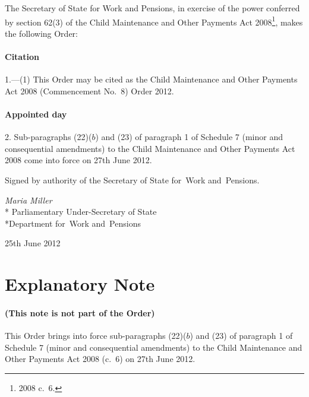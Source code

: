 \documentclass[12pt,a4paper]{article}
\title{\regstitle}
\author{S.I.\ 2012 No.\ 1649 (C.~61)}
\date{Made
25th June 2012
}
\begin{document}
\maketitle

\noindent
The Secretary of State for Work and Pensions, in exercise of the power conferred by section 62(3) of the Child Maintenance and Other Payments Act 2008\footnote{2008 c.~6.}, makes the following Order: 

{\sloppy

\tableofcontents

}

\bigskip

\setcounter{secnumdepth}{-2}

\subsection[1. Citation]{Citation}

1.---(1)  This Order may be cited as the Child Maintenance and Other Payments Act 2008 (Commencement No.~8) Order 2012.

\subsection[2. Appointed day]{Appointed day}

2.  Sub-paragraphs (22)($b$)  and (23) of paragraph 1 of Schedule 7 (minor and consequential amendments) to the Child Maintenance and Other Payments Act 2008 come into force on 27th June 2012. 

\bigskip

\pagebreak[3]

Signed 
by authority of the 
Secretary of State for~Work and~Pensions.

{\raggedleft
\emph{Maria Miller}\\*
Parliamentary Under-Secretary 
of State\\*Department 
for~Work and~Pensions

}

25th June 2012

\small

\part{Explanatory Note}

\renewcommand\parthead{— Explanatory Note}

\subsection*{(This note is not part of the Order)}

This Order brings into force sub-paragraphs (22)($b$)  and (23) of paragraph 1 of Schedule 7 (minor and consequential amendments) to the Child Maintenance and Other Payments Act 2008 (c.~6) on 27th June 2012. 
\end{document}
